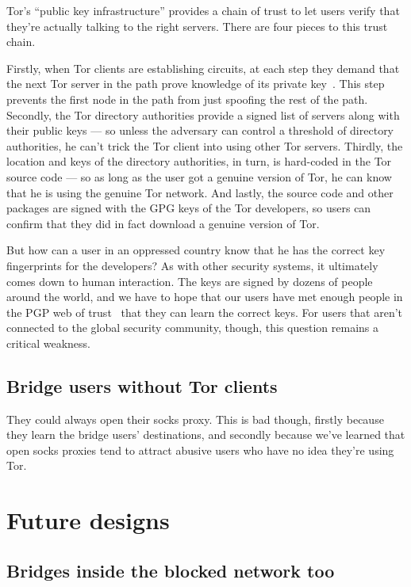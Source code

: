 \documentclass{llncs}
\begin{document}
Tor's ``public key infrastructure'' provides a chain of trust to
let users verify that they're actually talking to the right servers.
There are four pieces to this trust chain.

Firstly, when Tor clients are establishing circuits, at each step
they demand that the next Tor server in the path prove knowledge of
its private key~\cite{tor-design}. This step prevents the first node
in the path from just spoofing the rest of the path. Secondly, the
Tor directory authorities provide a signed list of servers along with
their public keys --- so unless the adversary can control a threshold
of directory authorities, he can't trick the Tor client into using other
Tor servers. Thirdly, the location and keys of the directory authorities,
in turn, is hard-coded in the Tor source code --- so as long as the user
got a genuine version of Tor, he can know that he is using the genuine
Tor network. And lastly, the source code and other packages are signed
with the GPG keys of the Tor developers, so users can confirm that they
did in fact download a genuine version of Tor.

But how can a user in an oppressed country know that he has the correct
key fingerprints for the developers? As with other security systems, it
ultimately comes down to human interaction. The keys are signed by dozens
of people around the world, and we have to hope that our users have met
enough people in the PGP web of trust~\cite{pgp-wot} that they can learn
the correct keys. For users that aren't connected to the global security
community, though, this question remains a critical weakness.

\subsection{Bridge users without Tor clients}

They could always open their socks proxy. This is bad though, firstly
because they learn the bridge users' destinations, and secondly because
we've learned that open socks proxies tend to attract abusive users who
have no idea they're using Tor.

\section{Future designs}

\subsection{Bridges inside the blocked network too}
\end{document}
